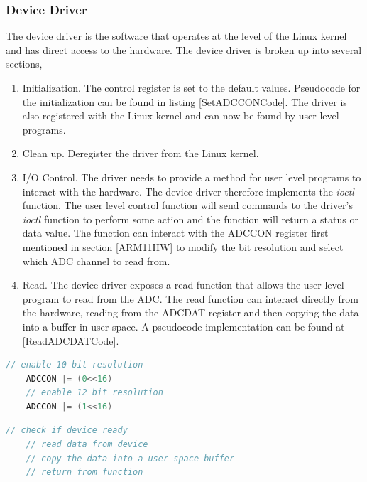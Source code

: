\documentclass[10pt,conference]{IEEEtran}
\begin{document}
\subsubsection{Device Driver}\label{DeviceDriver}
The device driver is the software that operates at the level of the Linux kernel and has direct access to the hardware. The device driver is broken up into several sections,
\begin{enumerate}
	\item Initialization. The control register is set to the default values. Pseudocode for the initialization can be found in listing \ref{SetADCCONCode}. The driver is also registered with the Linux kernel and can now be found by user level programs.
	\item Clean up. Deregister the driver from the Linux kernel.
	\item I/O Control. The driver needs to provide a method for user level programs to interact with the hardware. The device driver therefore implements the \emph{ioctl} function. The user level control function will send commands to the driver's \emph{ioctl} function to perform some action and the function will return a status or data value. The function can interact with the ADCCON register first mentioned in section \ref{ARM11HW} to modify the bit resolution and select which ADC channel to read from.
	\item Read. The device driver exposes a read function that allows the user level program to read from the ADC. The read function can interact directly from the hardware, reading from the ADCDAT register and then copying the data into a buffer in user space. A pseudocode implementation can be found at \ref{ReadADCDATCode}.
\end{enumerate}

\begin{lstlisting}[language=C, frame=single, caption=Pseudo Code to Prepare ADCCON,label=SetADCCONCode]
	// enable 10 bit resolution
	ADCCON |= (0<<16)
	// enable 12 bit resolution
	ADCCON |= (1<<16)
\end{lstlisting}

\begin{lstlisting}[language=C, frame=single, caption=Pseudo Code to read and write ADCDAT,label=ReadADCDATCode]
	// check if device ready
	// read data from device
	// copy the data into a user space buffer
	// return from function
\end{lstlisting}
\end{document}
